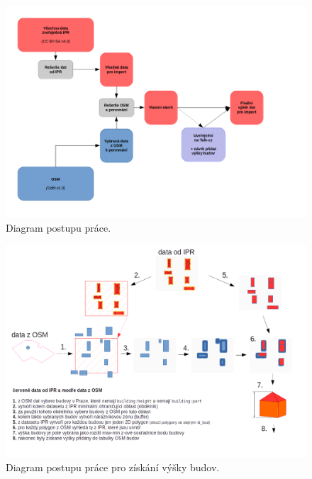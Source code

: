 \begin{figure}[H]
  \centering
  \includegraphics[scale=0.60,angle=90]{pictures/WorkFlow.png}
  \caption{Diagram postupu práce.}
  \label{fig:diagram_workflow}
\end{figure}

\begin{figure}[H]
  \centering
  \includegraphics[scale=0.60,angle=90]{pictures/diagram_building_height.png}
  \caption{Diagram postupu práce pro získání výšky budov.}
  \label{fig:diagram_building}
\end{figure}


